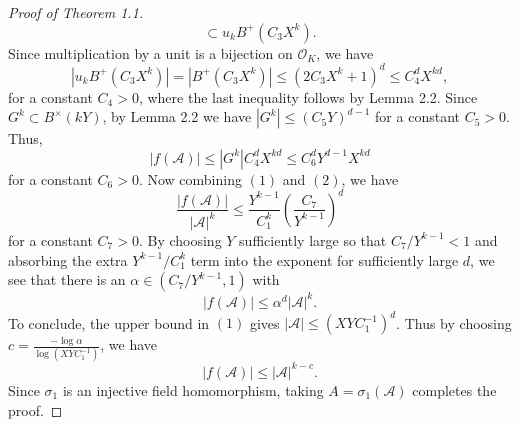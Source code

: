 \documentclass[10pt,a4paper]{amsart}
\begin{document}
\begin{proof}[Proof of Theorem 1.1]
\[\subset u_kB^+(C_3X^k).
\]
Since multiplication by a unit is a bijection on $\mathcal O_K$, we have 
\[
|u_kB^+(C_3X^k)|=|B^+(C_3X^k)|\leq (2C_3X^k+1)^d\leq C_4^d X^{kd},
\]
for a constant $C_4>0$, where the last inequality follows by Lemma 2.2. Since $G^k\subset B^\times(kY)$, by Lemma 2.2 we have $|G^k|\leq(C_5Y)^{d-1}$ for a constant $C_5>0$. Thus, 
\[
|f(\mathcal A)|\leq|G^k|C_4^dX^{kd}\leq C_6^dY^{d-1}X^{kd}
\tag{2}
\]
for a constant $C_6>0$. Now combining $(1)$ and $(2)$, we have
\[
\frac{|f(\mathcal A)|}{|\mathcal A|^k}\leq \frac{Y^{k-1}}{C_1^k}\left(\frac{C_7}{Y^{k-1}}\right)^d
\]
for a constant $C_7>0$. By choosing $Y$ sufficiently large so that $C_7/Y^{k-1}<1$ and absorbing the extra $Y^{k-1}/C_1^k$ term into the exponent for sufficiently large $d$, we see that there is an $\alpha\in(C_7/Y^{k-1},1)$ with
\[
|f(\mathcal A)|\leq \alpha^d|\mathcal A|^k.
\]
To conclude, the upper bound in $(1)$ gives $|\mathcal A|\leq(XYC_1^{-1})^d$. Thus by choosing $c=\frac{-\log\alpha}{\log(XYC_1^{-1})}$, we have
\[
|f(\mathcal A)|\leq|\mathcal A|^{k-c}.
\]
Since $\sigma_1$ is an injective field homomorphism, taking $A=\sigma_1(\mathcal A)$ completes the proof.
\end{proof}
\end{document}
